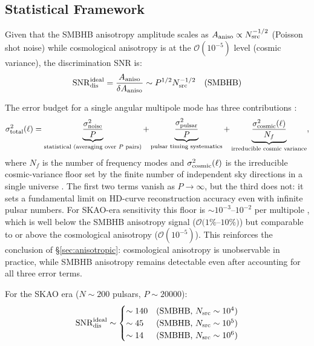 \documentclass[11pt,a4paper]{article}
\begin{document}
\subsection{Statistical Framework}\label{sec:statistical}

Given that the SMBHB anisotropy amplitude scales as $A_{\rm aniso} \propto N_{\rm src}^{-1/2}$ (Poisson shot noise) while cosmological anisotropy is at the $\mathcal{O}(10^{-5})$ level (cosmic variance), the discrimination SNR is:
\begin{equation}
\mathrm{SNR}_{\rm dis}^{\rm ideal} = \frac{A_{\rm aniso}}{\delta A_{\rm aniso}} \sim P^{1/2} N_{\rm src}^{-1/2} \quad \text{(SMBHB)}
\end{equation}

The error budget for a single angular multipole mode has three contributions \cite{Allen:2023variance,Domcke:2025}:
\begin{equation}
\sigma_{\rm total}^2(\ell) = \underbrace{\frac{\sigma_{\rm noise}^2}{P}}_{\text{statistical (averaging over } P \text{ pairs)}} + \underbrace{\frac{\sigma_{\rm pulsar}^2}{P}}_{\text{pulsar timing systematics}} + \underbrace{\frac{\sigma_{\rm cosmic}^2(\ell)}{N_f}}_{\text{irreducible cosmic variance}},
\end{equation}
where $N_f$ is the number of frequency modes and $\sigma_{\rm cosmic}^2(\ell)$ is the irreducible cosmic-variance floor set by the finite number of independent sky directions in a single universe \cite{Allen:2023variance,AllenRomano:2024}. The first two terms vanish as $P \to \infty$, but the third does not: it sets a fundamental limit on HD-curve reconstruction accuracy even with infinite pulsar numbers. For SKAO-era sensitivity this floor is $\sim 10^{-3}$--$10^{-2}$ per multipole \cite{Domcke:2025}, which is well below the SMBHB anisotropy signal ($\mathcal{O}(1\%$--$10\%)$) but comparable to or above the cosmological anisotropy ($\mathcal{O}(10^{-5})$). This reinforces the conclusion of §\ref{sec:anisotropic}: cosmological anisotropy is unobservable in practice, while SMBHB anisotropy remains detectable even after accounting for all three error terms.

For the SKAO era ($N \sim 200$ pulsars, $P \sim 20000$):
\begin{equation}
\mathrm{SNR}_{\rm dis}^{\rm ideal} \sim \begin{cases}
\sim 140 & \text{(SMBHB, $N_{\rm src} \sim 10^4$)}\\
\sim 45 & \text{(SMBHB, $N_{\rm src} \sim 10^5$)}\\
\sim 14 & \text{(SMBHB, $N_{\rm src} \sim 10^6$)}
\end{cases}
\end{equation}
\end{document}

